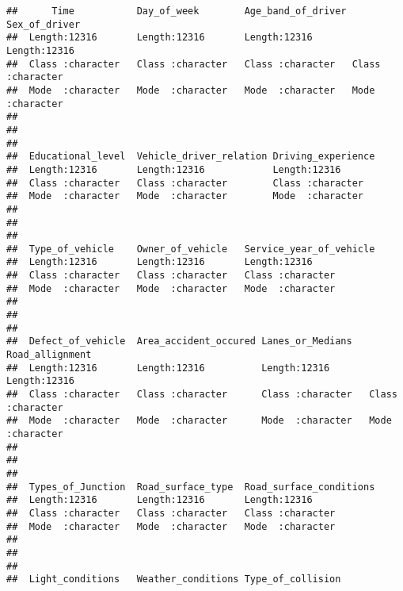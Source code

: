 \documentclass[
]{article}
\begin{document}
\begin{verbatim}
##      Time           Day_of_week        Age_band_of_driver Sex_of_driver     
##  Length:12316       Length:12316       Length:12316       Length:12316      
##  Class :character   Class :character   Class :character   Class :character  
##  Mode  :character   Mode  :character   Mode  :character   Mode  :character  
##                                                                             
##                                                                             
##                                                                             
##  Educational_level  Vehicle_driver_relation Driving_experience
##  Length:12316       Length:12316            Length:12316      
##  Class :character   Class :character        Class :character  
##  Mode  :character   Mode  :character        Mode  :character  
##                                                               
##                                                               
##                                                               
##  Type_of_vehicle    Owner_of_vehicle   Service_year_of_vehicle
##  Length:12316       Length:12316       Length:12316           
##  Class :character   Class :character   Class :character       
##  Mode  :character   Mode  :character   Mode  :character       
##                                                               
##                                                               
##                                                               
##  Defect_of_vehicle  Area_accident_occured Lanes_or_Medians   Road_allignment   
##  Length:12316       Length:12316          Length:12316       Length:12316      
##  Class :character   Class :character      Class :character   Class :character  
##  Mode  :character   Mode  :character      Mode  :character   Mode  :character  
##                                                                                
##                                                                                
##                                                                                
##  Types_of_Junction  Road_surface_type  Road_surface_conditions
##  Length:12316       Length:12316       Length:12316           
##  Class :character   Class :character   Class :character       
##  Mode  :character   Mode  :character   Mode  :character       
##                                                               
##                                                               
##                                                               
##  Light_conditions   Weather_conditions Type_of_collision 

\end{verbatim}
\end{document}
